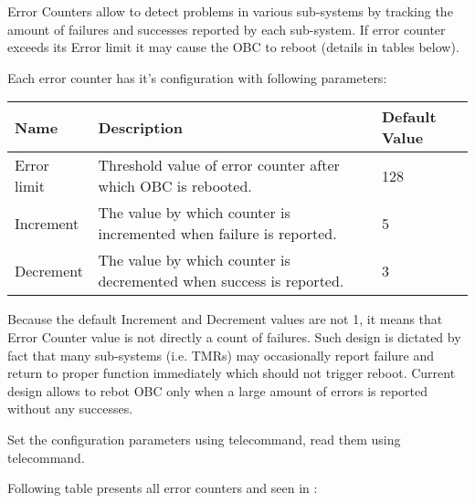 
Error Counters allow to detect problems in various sub-systems by tracking the amount of failures and successes reported by each sub-system. If error counter exceeds its Error limit it may cause the OBC to reboot (details in tables below).

Each error counter has it's configuration with following parameters:

\begin{longtable}{l|l|l}
    \toprule
    \textbf{Name} & \textbf{Description}                                                & \textbf{Default Value} \\
    \midrule
    Error limit & Threshold value of error counter after which OBC is rebooted.         & 128   \\ \hline
    Increment   & The value by which counter is incremented when failure is reported.   & 5     \\ \hline
    Decrement   & The value by which counter is decremented when success is reported.   & 3     \\
    \bottomrule
\end{longtable}

Because the default Increment and Decrement values are not 1, it means that Error Counter value is not directly a count of failures. Such design is dictated by fact that many sub-systems (i.e. TMRs) may occasionally report failure and return to proper function immediately which should not trigger reboot. Current design allows to rebot OBC only when a large amount of errors is reported without any successes.

Set the configuration parameters using  telecommand, read them using  telecommand.

Following table presents all error counters and seen in :

